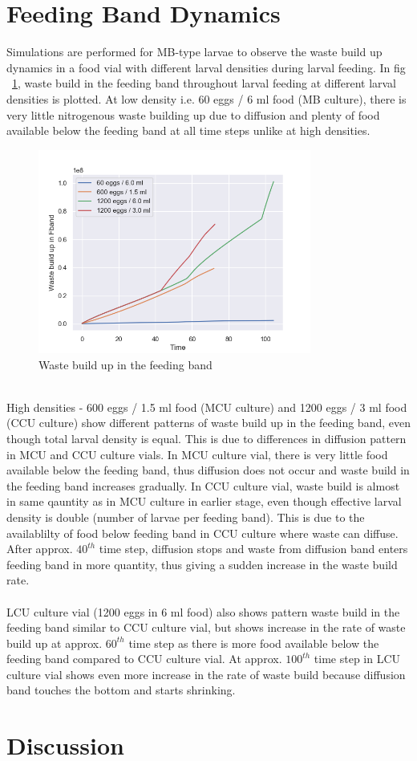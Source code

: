 \newpage
\section{Feeding Band Dynamics}
Simulations are performed for MB-type larvae to observe the waste build up dynamics in a food vial with different larval densities during larval feeding. In fig ~\ref{fig:waste}, waste build in the feeding band throughout larval feeding at different larval densities is plotted. At low density i.e. 60 eggs / 6 ml food (MB culture), there is very little nitrogenous waste building up due to diffusion and plenty of food available below the feeding band at all time steps unlike at high densities. \\
\begin{figure}[h]
  \centering
  \includegraphics[width=0.8\textwidth]{C2/Figs/waste build up}
  \caption{Waste build up in the feeding band}
  \label{fig:waste}
\end{figure}\\

High densities - 600 eggs / 1.5 ml food (MCU culture) and 1200 eggs / 3 ml food (CCU culture) show different patterns of waste build up in the feeding band, even though total larval density is equal. This is due to differences in diffusion pattern in MCU and CCU culture vials. In MCU culture vial, there is very little food available below the feeding band, thus diffusion does not occur and waste build in the feeding band increases gradually. In CCU culture vial, waste build is almost in same qauntity as in MCU culture in earlier stage, even though effective larval density is double (number of larvae per feeding band). This is due to the availablilty of food below feeding band in CCU culture where waste can diffuse. After approx. $40^{th}$ time step, diffusion stops and waste from diffusion band enters feeding band in more quantity, thus giving a sudden increase in the waste build rate. \\ \\
LCU culture vial (1200 eggs in 6 ml food) also shows pattern waste build in the feeding band similar to CCU culture vial, but shows increase in the rate of waste build up at approx. $60^{th}$ time step as there is more food available below the feeding band compared to CCU culture vial. At approx. $100^{th}$ time step in LCU culture vial shows even more increase in the rate of waste build because diffusion band touches the bottom and starts shrinking.

\section{Discussion}

\pagebreak
\renewcommand\bibname{{References}}


